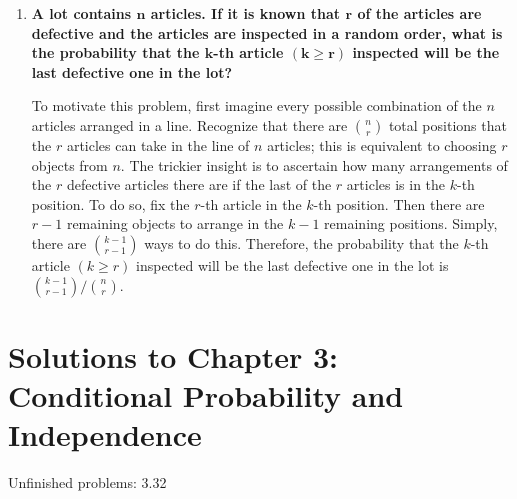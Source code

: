 \documentclass[10pt, oneside]{article}
\begin{document}
\begin{enumerate}[label=2.\arabic*]
  $5! = \boxed{120}$ ways.
  
\item \begin{tcolorbox}[
  colback=Cerulean!5!white,
  colframe=Cerulean!75!black]
  \textbf{A lot contains $\bm{n}$ articles. If it is known that $\bm{r}$ of the articles are defective and the articles are inspected in a random order, what is the probability that the $\bm{k}$-th article $\bm{(k \geq r)}$ inspected will be the last defective one in the lot?}
  \end{tcolorbox}
  
  To motivate this problem, first imagine every possible combination of the $n$ articles arranged in a line. Recognize that there are $\binom{n}{r}$ total positions that the $r$ articles can take in the line of $n$ articles; this is equivalent to choosing $r$ objects from $n$. The trickier insight is to ascertain how many arrangements of the $r$ defective articles there are if the last of the $r$ articles is in the $k$-th position. To do so, fix the $r$-th article in the $k$-th position. Then there are $r-1$ remaining objects to arrange in the $k-1$ remaining positions. Simply, there are $\binom{k-1}{r-1}$ ways to do this. Therefore, the probability that the $k$-th article $(k \geq r)$ inspected will be the last defective one in the lot is $\boxed{\binom{k-1}{r-1} / \binom{n}{r}}$.
\end{enumerate}

\newpage


\setcounter{cor}{0}
\setcounter{prop}{0}
\setcounter{cor*}{0}

{}
\section*{Solutions to Chapter 3: Conditional Probability and Independence}

Unfinished problems: 3.32
\end{document}
